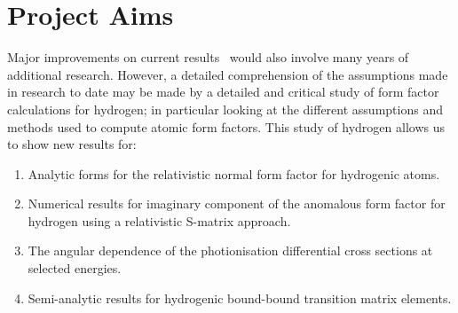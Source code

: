 \section{Project Aims}
Major improvements on current results~\cite{Chantler-Book}
would also involve many years of additional research.
However, a detailed comprehension of the assumptions made in research to date 
may be made by a detailed and critical study of form factor calculations for
hydrogen; in particular looking at the different assumptions and methods used to
compute atomic form factors.
This study of hydrogen allows us to show new results for:
\begin{enumerate}
    \item Analytic forms for the relativistic normal form factor for hydrogenic 
          atoms.
    \item Numerical results for imaginary
          component of the anomalous form factor for hydrogen using a
          relativistic S-matrix approach.
    \item The angular dependence of the photionisation differential cross
          sections at selected energies.
    \item Semi-analytic results for hydrogenic bound-bound transition matrix elements.
\end{enumerate}

